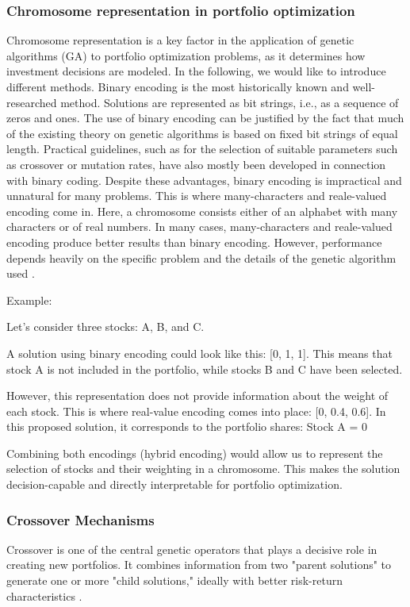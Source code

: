 \documentclass{agasthesis}
\begin{document}
\subsubsection{Chromosome representation in portfolio optimization}
Chromosome representation is a key factor in the application of genetic algorithms (GA) to portfolio optimization problems, as it determines how investment 
decisions are modeled. In the following, we would like to introduce different methods. Binary encoding is the most historically 
known and well-researched method. Solutions are represented as bit strings, i.e., as a sequence of zeros and ones. 
The use of binary encoding can be justified by the fact that much of the existing theory on genetic algorithms is based on fixed bit strings of equal length. 
Practical guidelines, such as for the selection of suitable parameters such as crossover or mutation rates, have also mostly been developed 
in connection with binary coding. Despite these advantages, binary encoding is impractical and unnatural for many problems. 
This is where many-characters and reale-valued encoding come in. Here, a chromosome consists either of an alphabet with many characters or of real numbers. 
In many cases, many-characters and reale-valued encoding produce better results than binary encoding. However, performance depends heavily on the specific 
problem and the details of the genetic algorithm used \cite[p. 117-118]{melanie_introduction_1999}.

Example:

Let's consider three stocks: A, B, and C.

A solution using binary encoding could look like this: [0, 1, 1]. This means that stock A is not included in the portfolio, 
while stocks B and C have been selected.

However, this representation does not provide information about the weight of each stock. This is where real-value encoding 
comes into place: [0, 0.4, 0.6]. In this proposed solution, it corresponds to the portfolio shares: Stock A = 0%

Combining both encodings (hybrid encoding) would allow us to represent the selection of stocks and their weighting in a chromosome. 
This makes the solution decision-capable and directly interpretable for portfolio optimization.

\subsubsection{Crossover Mechanisms}
Crossover is one of the central genetic operators that plays a decisive role in creating new portfolios. It combines information from two "parent solutions" 
to generate one or more "child solutions," ideally with better risk-return characteristics \cite[p. 8-9]{melanie_introduction_1999}.
\end{document}
